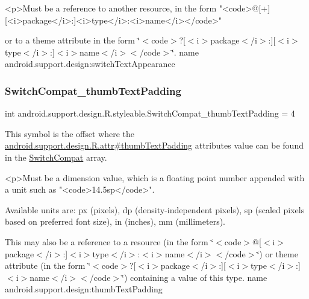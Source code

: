 \begin{DoxyVerb}      <p>Must be a reference to another resource, in the form "<code>@[+][<i>package</i>:]<i>type</i>:<i>name</i></code>"
\end{DoxyVerb}
 or to a theme attribute in the form \char`\"{}$<$code$>$?\mbox{[}$<$i$>$package$<$/i$>$\+:\mbox{]}\mbox{[}$<$i$>$type$<$/i$>$\+:\mbox{]}$<$i$>$name$<$/i$>$$<$/code$>$\char`\"{}.  name android.\+support.\+design\+:switch\+Text\+Appearance \mbox{\label{classandroid_1_1support_1_1design_1_1R_1_1styleable_a290e7ab17d9a3766ad3a7eea769ed634}} 
\subsubsection{\texorpdfstring{Switch\+Compat\+\_\+thumb\+Text\+Padding}{SwitchCompat\_thumbTextPadding}}
{\footnotesize\ttfamily int android.\+support.\+design.\+R.\+styleable.\+Switch\+Compat\+\_\+thumb\+Text\+Padding = 4\hspace{0.3cm}{\ttfamily [static]}}

This symbol is the offset where the \hyperlink{classandroid_1_1support_1_1design_1_1R_1_1attr_a8bbe4fd2d86639ceb48400901fef0015}{android.\+support.\+design.\+R.\+attr\#thumb\+Text\+Padding} attribute\textquotesingle{}s value can be found in the \hyperlink{classandroid_1_1support_1_1design_1_1R_1_1styleable_a7389a923bf3e321b6b5d10b0589547a1}{Switch\+Compat} array.

\begin{DoxyVerb}      <p>Must be a dimension value, which is a floating point number appended with a unit such as "<code>14.5sp</code>".
\end{DoxyVerb}
 Available units are\+: px (pixels), dp (density-\/independent pixels), sp (scaled pixels based on preferred font size), in (inches), mm (millimeters). 

This may also be a reference to a resource (in the form \char`\"{}$<$code$>$@\mbox{[}$<$i$>$package$<$/i$>$\+:\mbox{]}$<$i$>$type$<$/i$>$\+:$<$i$>$name$<$/i$>$$<$/code$>$\char`\"{}) or theme attribute (in the form \char`\"{}$<$code$>$?\mbox{[}$<$i$>$package$<$/i$>$\+:\mbox{]}\mbox{[}$<$i$>$type$<$/i$>$\+:\mbox{]}$<$i$>$name$<$/i$>$$<$/code$>$\char`\"{}) containing a value of this type.  name android.\+support.\+design\+:thumb\+Text\+Padding \mbox{\label{classandroid_1_1support_1_1design_1_1R_1_1styleable_a0b29ddbc27c35a3656e2bf93985678a8}} 
